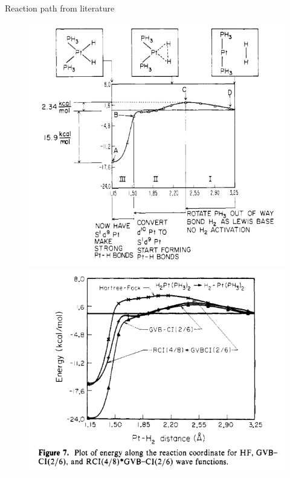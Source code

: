 \documentclass[10pt,aspectratio=43,mathserif]{beamer}
\begin{document}
\begin{frame}
Reaction path from literature
\begin{figure}
	\includegraphics[width=0.48\linewidth]{god1.jpg}
	\includegraphics[width=0.5\linewidth]{god2.jpg}
\end{figure}
\end{frame}

\end{document}
